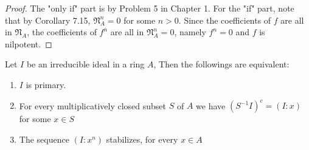 \documentclass{solution}
\begin{document}
\begin{proof}
    The "only if" part is by Problem 5 in Chapter 1. For the "if" part, note that by Corollary 7.15, $\mathfrak{N}_A^n = 0$ for some $n \gt 0$. Since the coefficients of $f$ are all in $\mathfrak{N}_A$, the coefficients of $f^n$ are all in $\mathfrak{N}_A^n = 0$, namely $f^n = 0$ and $f$ is nilpotent.
\end{proof}

\begin{problem}
    Let $I$ be an irreducible ideal in a ring $A$, Then the followings are equivalent:
    \begin{enumerate}
        \item $I$ is primary.
        \item For every multiplicatively closed subset $S$ of $A$ we have $(S ^{-1}I)^c = (I : x)$ for some $x \in S$
        \item The sequence $(I : x^n)$ stabilizes, for every $x \in A$
    \end{enumerate}
\end{problem}
\end{document}
